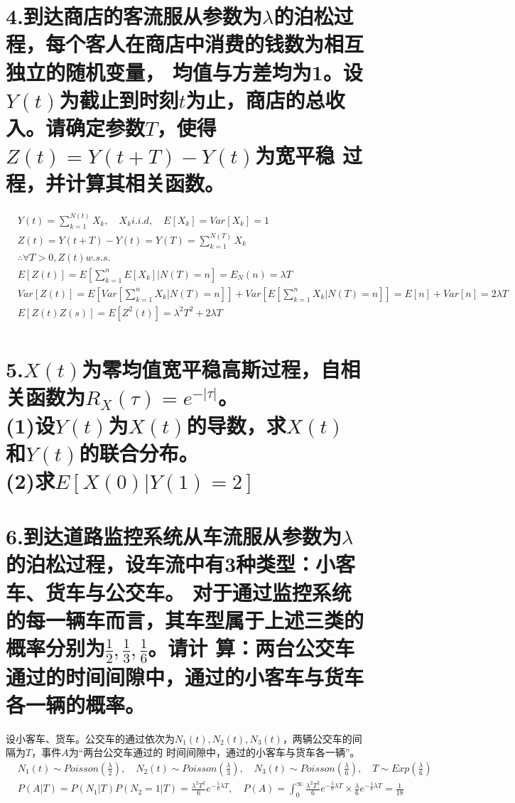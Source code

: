\documentclass[UTF8]{ctexart}
\begin{document}
\section*{4.到达商店的客流服从参数为$\lambda$的泊松过程，每个客人在商店中消费的钱数为相互独立的随机变量，
  均值与方差均为1。设$Y(t)$为截止到时刻$t$为止，商店的总收入。请确定参数$T$，使得$Z(t)=Y(t+T)-Y(t)$为宽平稳
  过程，并计算其相关函数。}
\begin{equation*}
  \begin{aligned}
     & Y(t)=\sum\limits_{k=1}^{N(t)}X_k,\quad X_k i.i.d,\quad E[X_k]=Var[X_k]=1 \\
     & Z(t)=Y(t+T)-Y(t)=Y(T)=\sum\limits_{k=1}^{N(T)}X_k                        \\
     & \therefore\forall T>0,Z(t)w.s.s.                                         \\
     & E[Z(t)]=E[\sum\limits_{k=1}^nE[X_k]\lvert N(T)=n]=E_N(n)=\lambda T       \\
     & Var[Z(t)]=E[Var[\sum\limits_{k=1}^nX_k\lvert N(T)=n]]+
    Var[E[\sum\limits_{k=1}^nX_k\lvert N(T)=n]]
    =E[n]+Var[n]=2\lambda T                                                     \\
     & E[Z(t)Z(s)]=E[Z^2(t)]=\lambda^2T^2+2\lambda T                            \\
  \end{aligned}
\end{equation*}
\section*{5.$X(t)$为零均值宽平稳高斯过程，自相关函数为$R_X(\tau)=e^{-\lvert\tau\rvert}$。\\
(1)设$Y(t)$为$X(t)$的导数，求$X(t)$和$Y(t)$的联合分布。\\
(2)求$E[X(0)\lvert Y(1)=2]$}

\section*{6.到达道路监控系统从车流服从参数为$\lambda$的泊松过程，设车流中有3种类型：小客车、货车与公交车。
  对于通过监控系统的每一辆车而言，其车型属于上述三类的概率分别为$\frac{1}{2},\frac{1}{3},\frac{1}{6}$。请计
  算：两台公交车通过的时间间隙中，通过的小客车与货车各一辆的概率。}
设小客车、货车。公交车的通过依次为$N_1(t),N_2(t),N_3(t)$，两辆公交车的间隔为$T$，事件$A$为“两台公交车通过的
时间间隙中，通过的小客车与货车各一辆”。
\begin{equation*}
  \begin{aligned}
     & N_1(t)\sim Poisson(\frac{\lambda}{2}),\quad N_2(t)\sim Poisson(\frac{\lambda}{3}),\quad
    N_3(t)\sim Poisson(\frac{\lambda}{6}),\quad T\sim Exp(\frac{\lambda}{6})                        \\
     & P(A\lvert T)=P(N_1\lvert T)P(N_2=1\lvert T)=\frac{\lambda^2T^2}{6}e^{-\frac{5}{6}\lambda T},
    \quad P(A)=\int_0^\infty\frac{\lambda^2T^2}{6}e^{-\frac{5}{6}\lambda T}\times
    \frac{\lambda}{6}e^{-\frac{1}{6}\lambda T}=\frac{1}{18}                                         \\
  \end{aligned}
\end{equation*}
\end{document}
